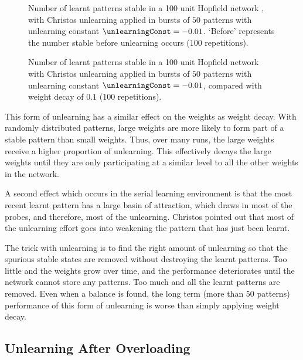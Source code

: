 \begin{figure}[tbp]
\small
\center
	\scalebox{0.95}{}
	\caption{Number of learnt patterns stable in a 100 unit Hopfield network , with Christos unlearning applied in bursts of $50$ patterns with unlearning constant $\unlearningConst = -0.01$.  `Before' represents the number stable before unlearning occurs (100 repetitions).}
	\label{fig:ChristosUnlearning}
\end{figure}

\begin{figure}[tbp]
\small
\center
	\scalebox{0.95}{}
	\caption{Number of learnt patterns stable in a 100 unit Hopfield network  with Christos unlearning applied in bursts of $50$ patterns with unlearning constant $\unlearningConst = -0.01$, compared with weight decay of $0.1$ (100 repetitions).}
	\label{fig:ChristosUnlearningComp}
\end{figure}

This form of unlearning has a similar effect on the weights as weight decay.  With randomly distributed patterns, large weights are more likely to form part of a stable pattern than small weights.  Thus, over many runs, the large weights receive a higher proportion of unlearning.  This effectively decays the large weights until they are only participating at a similar level to all the other weights in the network.  

A second effect which occurs in the serial learning environment is that the most recent learnt pattern has a large basin of attraction, which draws in most of the probes, and therefore, most of the unlearning.  Christos pointed out that most of the unlearning effort goes into weakening the pattern that has just been learnt. 

The trick with unlearning is to find the right amount of unlearning so that the spurious stable states are removed without destroying the learnt patterns.  Too little and the weights grow over time, and the performance deteriorates until the network cannot store any patterns. Too much and all the learnt patterns are removed.  Even when a balance is found, the long term (more than 50 patterns) performance of this form of unlearning is worse than simply applying weight decay.

\subsection{Unlearning After Overloading}
\label{sec:vanHemmenUnlearning}

